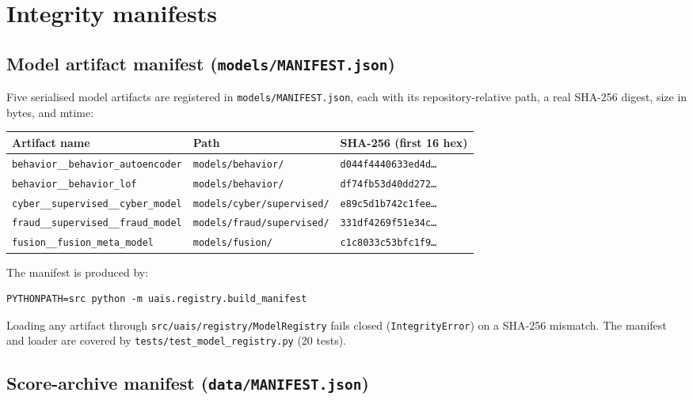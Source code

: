 \section{Integrity manifests}
\label{sec:app-repro-manifests}

\subsection{Model artifact manifest (\texttt{models/MANIFEST.json})}

Five serialised model artifacts are registered in
\texttt{models/MANIFEST.json}, each with its repository-relative path, a
real SHA-256 digest, size in bytes, and mtime:

\begin{center}
\begin{tabular}{lll}
\toprule
Artifact name & Path & SHA-256 (first 16 hex) \\
\midrule
\texttt{behavior\_\_behavior\_autoencoder} &
  \texttt{models/behavior/} & \texttt{d044f4440633ed4d\ldots} \\
\texttt{behavior\_\_behavior\_lof} &
  \texttt{models/behavior/} & \texttt{df74fb53d40dd272\ldots} \\
\texttt{cyber\_\_supervised\_\_cyber\_model} &
  \texttt{models/cyber/supervised/} & \texttt{e89c5d1b742c1fee\ldots} \\
\texttt{fraud\_\_supervised\_\_fraud\_model} &
  \texttt{models/fraud/supervised/} & \texttt{331df4269f51e34c\ldots} \\
\texttt{fusion\_\_fusion\_meta\_model} &
  \texttt{models/fusion/} & \texttt{c1c8033c53bfc1f9\ldots} \\
\bottomrule
\end{tabular}
\end{center}

The manifest is produced by:

\begin{verbatim}
PYTHONPATH=src python -m uais.registry.build_manifest
\end{verbatim}

Loading any artifact through \texttt{src/uais/registry/ModelRegistry} fails
closed (\texttt{IntegrityError}) on a SHA-256 mismatch.  The manifest and
loader are covered by \texttt{tests/test\_model\_registry.py} (20 tests).

\subsection{Score-archive manifest (\texttt{data/MANIFEST.json})}

